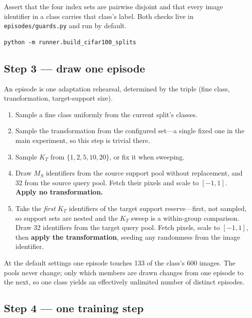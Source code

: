 \documentclass[11pt]{article}
\newcommand{\KT}{K_{T}}
\newcommand{\MS}{M_{S}}
\begin{document}
Assert that the four index sets are pairwise disjoint and that every image identifier in a class
carries that class's label. Both checks live in \texttt{episodes/guards.py} and run by default.

\begin{verbatim}
python -m runner.build_cifar100_splits
\end{verbatim}

\subsection*{Step 3 --- draw one episode}

An episode is one adaptation rehearsal, determined by the triple (fine class, transformation,
target-support size).

\begin{enumerate}[leftmargin=*, itemsep=3pt]
\item Sample a fine class uniformly from the current split's classes.
\item Sample the transformation from the configured set---a single fixed one in the main
      experiment, so this step is trivial there.
\item Sample $\KT$ from $\{1,2,5,10,20\}$, or fix it when sweeping.
\item Draw $\MS$ identifiers from the source support pool without replacement, and 32 from the
      source query pool. Fetch their pixels and scale to $[-1,1]$. \textbf{Apply no
      transformation.}
\item Take the \emph{first} $\KT$ identifiers of the target support reserve---first, not sampled,
      so support sets are nested and the $\KT$ sweep is a within-group comparison. Draw 32
      identifiers from the target query pool. Fetch pixels, scale to $[-1,1]$, then \textbf{apply
      the transformation}, seeding any randomness from the image identifier.
\end{enumerate}

At the default settings one episode touches 133 of the class's 600 images. The pools never change;
only which members are drawn changes from one episode to the next, so one class yields an
effectively unlimited number of distinct episodes.

\subsection*{Step 4 --- one training step}
\end{document}
